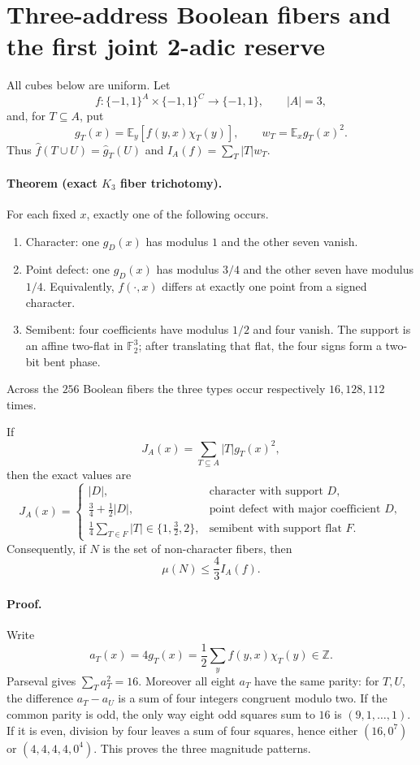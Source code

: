 \section*{Three-address Boolean fibers and the first joint 2-adic reserve}

All cubes below are uniform.  Let
\[
 f:\{-1,1\}^{A}\times\{-1,1\}^{C}\longrightarrow\{-1,1\},
 \qquad |A|=3,
\]
and, for $T\subseteq A$, put
\[
 g_T(x)=\mathbb E_y[f(y,x)\chi_T(y)],\qquad
 w_T=\mathbb E_x g_T(x)^2.
\]
Thus $\widehat f(T\cup U)=\widehat g_T(U)$ and
$I_A(f)=\sum_T |T|w_T$.

\paragraph{Theorem (exact $K_3$ fiber trichotomy).}
For each fixed $x$, exactly one of the following occurs.
\begin{enumerate}
\item Character: one $g_D(x)$ has modulus $1$ and the other seven vanish.
\item Point defect: one $g_D(x)$ has modulus $3/4$ and the other seven
have modulus $1/4$.  Equivalently, $f(\cdot,x)$ differs at exactly one
point from a signed character.
\item Semibent: four coefficients have modulus $1/2$ and four vanish.
The support is an affine two-flat in $\mathbb F_2^3$; after translating
that flat, the four signs form a two-bit bent phase.
\end{enumerate}
Across the $256$ Boolean fibers the three types occur respectively
$16,128,112$ times.

If
\[
 J_A(x)=\sum_{T\subseteq A}|T|g_T(x)^2,
\]
then the exact values are
\[
 J_A(x)=
 \begin{cases}
 |D|,&\text{character with support $D$},\\
 \frac34+\frac12|D|,&\text{point defect with major coefficient $D$},\\
 \frac14\sum_{T\in F}|T|\in\{1,\frac32,2\},
   &\text{semibent with support flat $F$}.
 \end{cases}
\]
Consequently, if $N$ is the set of non-character fibers, then
\[
 \mu(N)\le \frac43 I_A(f).
\tag{1}
\]

\paragraph{Proof.}
Write
\[
 a_T(x)=4g_T(x)=\frac12\sum_y f(y,x)\chi_T(y)\in\mathbb Z.
\]
Parseval gives $\sum_T a_T^2=16$.  Moreover all eight $a_T$ have the
same parity: for $T,U$, the difference $a_T-a_U$ is a sum of four
integers congruent modulo two.  If the common parity is odd, the only
way eight odd squares sum to $16$ is $(9,1,\ldots,1)$.  If it is even,
division by four leaves a sum of four squares, hence either $(16,0^7)$
or $(4,4,4,4,0^4)$.  This proves the three magnitude patterns.

